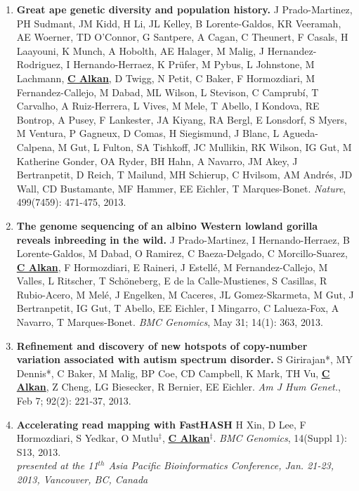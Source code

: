 \begin{enumerate}
 \item
        {\bf Great ape genetic diversity and population history.}
        J Prado-Martinez, PH Sudmant, JM Kidd, H Li, JL Kelley, B Lorente-Galdos, KR Veeramah, AE Woerner, TD O’Connor, G Santpere, A Cagan, C Theunert, F Casals, H Laayouni, K Munch, A Hobolth, AE Halager, M Malig, J Hernandez-Rodriguez, I Hernando-Herraez, K Prüfer, M Pybus, L Johnstone, M Lachmann, {\bf {\underline {C Alkan}}}, D Twigg, N Petit, C Baker, F Hormozdiari, M Fernandez-Callejo, M Dabad, ML Wilson, L Stevison, C Camprubí, T Carvalho, A Ruiz-Herrera, L Vives, M Mele, T Abello, I Kondova, RE Bontrop, A Pusey, F Lankester, JA Kiyang, RA Bergl, E Lonsdorf, S Myers, M Ventura, P Gagneux, D Comas, H Siegismund, J Blanc, L Agueda-Calpena, M Gut, L Fulton, SA Tishkoff, JC Mullikin, RK Wilson, IG Gut, M Katherine Gonder, OA Ryder, BH Hahn, A Navarro, JM Akey, J Bertranpetit, D Reich, T Mailund, MH Schierup, C Hvilsom, AM Andrés, JD Wall, CD Bustamante, MF Hammer, EE Eichler, T Marques-Bonet. 
        {\em Nature}, 499(7459): 471-475, 2013.

        

\item
        {\bf The genome sequencing of an albino Western lowland gorilla reveals inbreeding in the wild.}
        J Prado-Martinez, I Hernando-Herraez, B Lorente-Galdos, M Dabad, O Ramirez, C Baeza-Delgado, C Morcillo-Suarez, 
        {\bf {\underline {C Alkan}}}, F Hormozdiari, E Raineri, J Estellé, M Fernandez-Callejo, M Valles, L Ritscher, T Schöneberg, E de la Calle-Mustienes, 
        S Casillas, R Rubio-Acero, M Melé, J Engelken, M Caceres, JL Gomez-Skarmeta, M Gut, J Bertranpetit, IG Gut, T Abello, 
        EE Eichler, I Mingarro, C Lalueza-Fox, A Navarro, T Marques-Bonet.
        {\em BMC Genomics}, May 31;  14(1): 363, 2013.

        
 \item
        {\bf Refinement and discovery of new hotspots of copy-number variation associated with autism spectrum disorder.}
        S Girirajan*, MY Dennis*, C Baker, M Malig, BP Coe, CD Campbell, K Mark, TH Vu,
        {\bf {\underline {C Alkan}}}, Z Cheng, LG Biesecker, R Bernier, EE Eichler.
        {\em Am J Hum Genet.}, Feb 7;  92(2): 221-37, 2013.

 \item
        {\bf Accelerating read mapping with FastHASH}
        H Xin, D Lee, F Hormozdiari, S Yedkar, O Mutlu$^\ddag$, {\bf {\underline {C Alkan}}}$^\ddag$.
        {\em BMC Genomics}, 14(Suppl 1): S13, 2013.\\
        \hspace*{1cm} {\footnotesize {\em presented at the  11$^{th}$  Asia Pacific Bioinformatics Conference,
            Jan. 21-23, 2013, Vancouver, BC, Canada}}
       

\end{enumerate}
